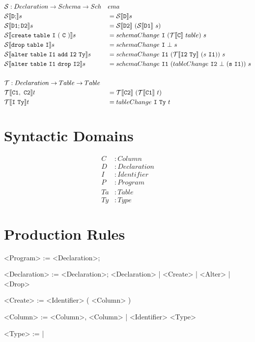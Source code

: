\documentclass[12pt]{article}
\newcommand{\cmp}[2]{
  \mathcal{#1}|[ \mathtt{ \StrSubstitute{#2}{ }{\ } } |]
}
\begin{document}
\begin{alignat*}{2}
  &\mathcal{S} : Declaration -> Schema -> Sch&&ema \\
  &\cmp{S}{D;}s &&= \cmp{S}{D}s \\
  &\cmp{S}{D1;D2}s &&= \cmp{S}{D2}\ (\cmp{S}{D1}\ s) \\
  &\cmp{S}{create table I ( C )} s &&= schemaChange\ \mathtt{I}\ (\cmp{T}{C}\ table)\ s \\
  &\cmp{S}{drop table I}s &&= schemaChange\ \mathtt{I}\ \bot\ s \\
  &\cmp{S}{alter table I1 add I2 Ty}s &&= schemaChange\ \mathtt{I1}\ (\cmp{T}{\mathtt{I2} Ty}\ (s\ \mathtt{I1}))\ s\\
  &\cmp{S}{alter table I1 drop I2}s &&= schemaChange\ \mathtt{I1}\ (tableChange\ \mathtt{I2}\ \bot\ (\mathtt{s}\ \mathtt{I1}))\ s \\
\\
  &\mathcal{T} : Declaration -> Table -> Table && \\
  &\cmp{T}{C1, C2}t &&= \cmp{T}{C2}\ (\cmp{T}{C1}\ t) \\
  &\cmp{T}{I Ty}t &&= tableChange\ \mathtt{I}\ \mathtt{Ty}\ t \\
\end{alignat*}

\newpage

\section{Syntactic Domains}
\begin{align*}
  C &: Column \\
  D &: Declaration \\
  I &: Identifier \\
  P &: Program \\
  Ta &: Table \\
  Ty &: Type
\end{align*}

\section{Production Rules}
\begin{grammar}
  <Program> := <Declaration>;

  <Declaration> := <Declaration>; <Declaration> | <Create> | <Alter> | <Drop>

  <Create> :=  <Identifier> ( <Column> )

  <Column> := <Column>, <Column> | <Identifier> <Type>

  <Type> :=  | 
\end{grammar}
\end{document}
